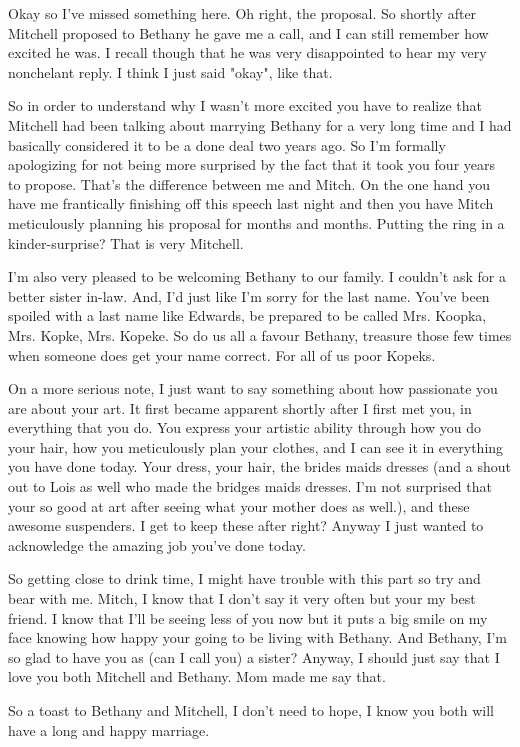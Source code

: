 Okay so I've missed something here. Oh right, the proposal. So shortly after Mitchell proposed to Bethany he gave me a call, and I can still remember how excited he was. I recall though that he was very disappointed to hear my very nonchelant reply. I think I just said "okay", like that.

So in order to understand why I wasn't more excited you have to realize that Mitchell had been talking about marrying Bethany for a very long time and I had basically considered it to be a done deal two years ago. So I'm formally apologizing for not being more surprised by the fact that it took you four years to propose. That's the difference between me and Mitch. On the one hand you have me frantically finishing off this speech last night and then you have Mitch meticulously planning his proposal for months and months. Putting the ring in a kinder-surprise? That is very Mitchell.

I'm also very pleased to be welcoming Bethany to our family. I couldn't ask for a better sister in-law. And, I'd just like I'm sorry for the last name. You've been spoiled with a last name like Edwards, be prepared to be called Mrs. Koopka, Mrs. Kopke, Mrs. Kopeke. So do us all a favour Bethany, treasure those few times when someone does get your name correct. For all of us poor Kopeks.

On a more serious note, I just want to say something about how passionate you are about your art. It first became apparent shortly after I first met you, in everything that you do. You express your artistic ability through how you do your hair, how you meticulously plan your clothes, and I can see it in everything you have done today. Your dress, your hair, the brides maids dresses (and a shout out to Lois as well who made the bridges maids dresses. I'm not surprised that your so good at art after seeing what your mother does as well.), and these awesome suspenders. I get to keep these after right? Anyway I just wanted to acknowledge the amazing job you've done today.

So getting close to drink time, I might have trouble with this part so try and bear with me. Mitch, I know that I don't say it very often but your my best friend. I know that I'll be seeing less of you now but it puts a big smile
on my face knowing how happy your going to be living with Bethany. And Bethany, I'm so glad to have you as (can I call you) a sister? Anyway, I should just say that I love you both Mitchell and Bethany. Mom made me say that.

So a toast to Bethany and Mitchell, I don't need to hope, I know you both will have a long and happy marriage.
